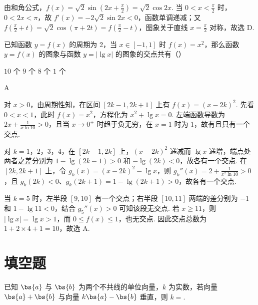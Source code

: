 \begin{solution}
由和角公式，\(f(x)=\sqrt{2}\sin\left(2x+\frac{\pi}{2}\right)=\sqrt{2}\cos2x\). 当 \(0<x<\frac{\pi}{2}\) 时，\(0<2x<\pi\)，故 \(f'(x)=-2\sqrt{2}\sin2x<0\)，函数单调递减；又 \(f\left(\frac{\pi}{2}+t\right)=\sqrt{2}\cos(\pi+2t)=f\left(\frac{\pi}{2}-t\right)\)，图象关于直线 \(x=\frac{\pi}{2}\) 对称，故选 D.
\end{solution}

\begin{problem}
已知函数 \( y = f(x) \) 的周期为 2，当 \( x \in [-1, 1] \) 时 \( f(x) = x^2 \)，那么函数 \( y = f(x) \) 的图象与函数 \( y = | \lg x | \) 的图象的交点共有（\quad）

\choices
    {\(10\) 个}
    {\(9\) 个}
    {\(8\) 个}
    {\(1\) 个}

\end{problem}

\begin{answer}
A
\end{answer}

\begin{solution}
对 \(x>0\)，由周期性知，在区间 \([2k-1,2k+1]\) 上有 \(f(x)=(x-2k)^2\). 先看 \(0<x<1\)，此时 \(f(x)=x^2\)，方程化为 \(x^2+\lg x=0\). 左端函数导数为 \(2x+\frac{1}{x\ln10}>0\)，且当 \(x\to0^+\) 时趋于负无穷，在 \(x=1\) 时为 \(1\)，故有且只有一个交点.

对 \(k=1\)，\(2\)，\(3\)，\(4\)，在 \([2k-1,2k]\) 上，\((x-2k)^2\) 递减而 \(\lg x\) 递增，端点处两者之差分别为 \(1-\lg(2k-1)>0\) 和 \(-\lg(2k)<0\)，故各有一个交点. 在 \([2k,2k+1]\) 上，令 \(g_k(x)=(x-2k)^2-\lg x\)，则 \(g_k''(x)=2+\frac{1}{x^2\ln10}>0\)，且 \(g_k(2k)<0\)、\(g_k(2k+1)=1-\lg(2k+1)>0\)，故各有一个交点.

当 \(k=5\) 时，左半段 \([9,10]\) 有一个交点；右半段 \([10,11]\) 两端的差分别为 \(-1\) 和 \(1-\lg11<0\)，结合 \(g_5''(x)>0\) 可知该段无交点. 若 \(x\geqslant11\)，则 \(|\lg x|=\lg x>1\)，而 \(0\leqslant f(x)\leqslant1\)，也无交点. 因此交点总数为 \(1+2\times4+1=10\)，故选 A.
\end{solution}

\section{填空题}

\begin{problem}
已知 \(\bs{a}\) 与 \(\bs{b}\) 为两个不共线的单位向量，\(k\) 为实数，若向量 \(\bs{a} + \bs{b}\) 与向量 \(k\bs{a} - \bs{b}\) 垂直，则 \(k = \)\fillinblank{}.

\end{problem}

